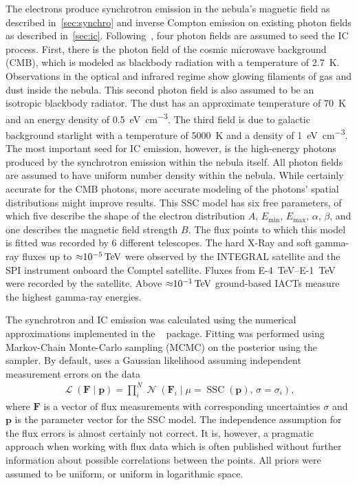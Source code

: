 The electrons produce synchrotron emission in the nebula's magnetic field as described in~\ref{sec:synchro}
and inverse Compton emission on existing photon fields as described in~\ref{sec:ic}.
Following~\cite{atoyan_crab}, four photon fields are assumed to seed the IC process. First, there is the photon field of
the cosmic microwave background (CMB), which is modeled as blackbody radiation with a temperature of \SI{2.7}{\kelvin}.
Observations in the optical and infrared regime show glowing filaments of gas and dust inside the nebula. 
This second photon field is also assumed to be an isotropic blackbody radiator. The dust has an approximate temperature of \SI{70}{\kelvin}
and an energy density of \SI{0.5}{\eV \per \cubic \centi \metre}.
The third field is due to galactic background starlight with a temperature of \SI{5000}{\kelvin} and a density
of \SI{1}{\eV \per \cubic \centi \metre}. The most important seed for IC emission, however, is the high-energy photons 
produced by the synchrotron emission within the nebula itself.
All photon fields are assumed to have uniform number density within the nebula. While certainly accurate for the CMB photons, more 
accurate modeling of the photons' spatial distributions might improve results.
This SSC model has six free parameters, of which five describe the shape of the
electron distribution $A$, $E_{\text{min}}$, $E_{\text{max}}$, $\alpha$, $\beta$, and one describes the magnetic field strength $B$.
The flux points to which this model is fitted was recorded by 6 different telescopes. The hard X-Ray and soft gamma-ray fluxes up to ${\approx}\SI{E-5}{TeV}$ were 
observed by the INTEGRAL satellite and the SPI instrument onboard the Comptel satellite.
Fluxes from \SIrange{E-4}{E-1}{\TeV} were recorded by the \fermi satellite.
Above ${\approx}\SI{E-1}{TeV}$ ground-based IACTs measure the highest gamma-ray energies. 

The synchrotron and IC emission was calculated using the numerical approximations implemented in the 
\naima~\cite{naima} package. Fitting was performed using Markov-Chain Monte-Carlo sampling (MCMC) 
on the posterior using the \emcee~\cite{emcee} sampler. 
By default, \naima uses a Gaussian likelihood assuming independent measurement errors on the data
\begin{eqnarray}
  \operatorname{\mathcal{L}}\left(\mathbf{F} \mid \mathbf{p} \right) = \prod_i^N \operatorname{\mathcal{N}}(\mathbf{F}_i \mid \mu\! =\! \operatorname{SSC}(\mathbf{p}), \, \sigma\! =\! \sigma_i),
\end{eqnarray}
where $\mathbf{F}$ is a vector of flux measurements with corresponding uncertainties $\sigma$ and $\mathbf{p}$ is the parameter vector
for the SSC model.
The independence assumption for the flux errors is almost certainly not correct. It is, however, a pragmatic approach when 
working with flux data which is often published without further information about possible correlations between the points. 
All priors were assumed to be uniform, or uniform in logarithmic space.


